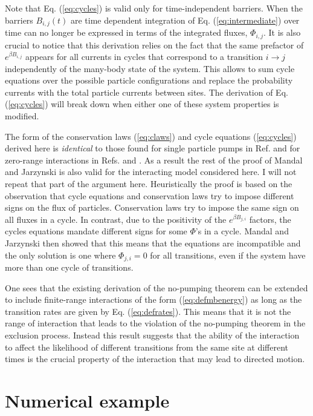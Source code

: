 \documentclass[aps,pre,showpacs,amsmath,amssymb,amsfonts,superscriptaddress,onecolumn,longbibliography]{revtex4-1}
\begin{document}
Note that Eq. (\ref{eq:cycles}) is valid only for time-independent barriers. When the barriers $B_{i,j} (t)$ are time dependent integration of Eq. (\ref{eq:intermediate}) over time can no longer be expressed in terms of the integrated fluxes, $\Phi_{i,j}$. It is also crucial to notice that this derivation
relies on the fact that the same prefactor of $e^{\beta B_{i,j}}$ appears for all currents in cycles that correspond to a transition $i\rightarrow j$
independently of the many-body state of the system. This allows to sum cycle equations over the possible particle configurations and replace
the probability currents with the total particle currents between sites. The derivation of Eq. (\ref{eq:cycles}) will break down when either one of these system
properties is modified.

The form of the conservation laws (\ref{eq:claws}) and cycle equations (\ref{eq:cycles}) derived here is {\em identical} to those
found for single particle pumps in Ref. \cite{mandal_proof_2011} and for zero-range interactions in Refs. \cite{asban_no-pumping_2014} and \cite{mandal_unification_2014}. As a result the rest of the proof of Mandal and Jarzynski \cite{mandal_proof_2011} is also valid for the
interacting model considered here. I will not repeat that part of the argument here. Heuristically the proof is based on the observation that cycle equations
and conservation laws try to impose different signs on the flux of particles. Conservation laws try to impose the same sign on all fluxes in a cycle. In contrast,
due to the positivity of the $e^{\beta B_{j,i}}$ factors, the cycles equations mandate different signs for some $\Phi$'s in a cycle.
Mandal and Jarzynski then showed that this means that the equations are incompatible and the only solution is one where $\Phi_{j,i}=0$ for all transitions,
even if the system have more than one cycle of transitions.

One sees that the existing derivation of the no-pumping theorem can be extended to include finite-range interactions of the form (\ref{eq:defmbenergy}) as long
as the transition rates are given by Eq. (\ref{eq:defrates}). This means that it is not the range of interaction that leads to the violation
of the no-pumping theorem in the exclusion process. Instead this result suggests that the ability of the interaction to affect the likelihood of different transitions from the
same site  at different times
is the crucial property of the interaction that may lead to directed motion.


\section{Numerical example}
\label{sec:num}
\end{document}
